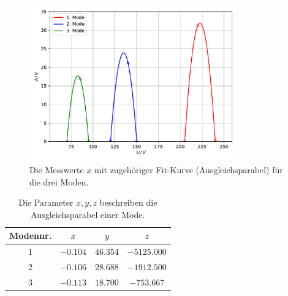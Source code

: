\begin{figure}
    \centering
    \includegraphics[width=0.8\textwidth]{content/data/moden.pdf}
    \caption{Die Messwerte $x$ mit zugehöriger Fit-Kurve (Ausgleichsparabel) für die drei Moden. \cite{matplotlib}\cite{numpy}}
    \label{fig:moden}
\end{figure}

\begin{table}
    \centering
    \caption{Die Parameter $x, y, z$ beschreiben die Ausgleichsparabel einer Mode.}
    \begin{tabular}{c c c c}
        \toprule
        Modennr. & $x$ & $y$ & $z$ \\
        \midrule
        1 & $-0.104$ & $46.354$ & $-5125.000$ \\
        2 & $-0.106$ & $28.688$ & $-1912.500$ \\
        3 & $-0.113$ & $18.700$ & $-753.667$ \\
        \bottomrule
    \end{tabular}
    \label{tab:moden_ergebnisse}
\end{table}
\FloatBarrier

